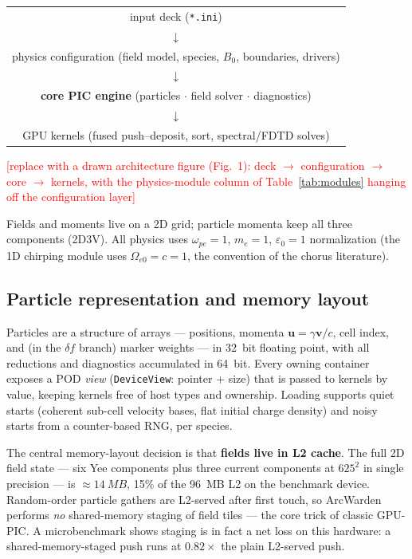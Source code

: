 \documentclass[11pt]{article}
\newcommand{\tocheck}[1]{\textcolor{red}{[#1]}}
\newcommand{\arcw}{ArcWarden}
\begin{document}
\begin{center}
\begin{tabular}{c}
input deck (\texttt{*.ini})\\
$\downarrow$\\
physics configuration (field model, species, $B_0$, boundaries, drivers)\\
$\downarrow$\\
\textbf{core PIC engine} (particles $\cdot$ field solver $\cdot$ diagnostics)\\
$\downarrow$\\
GPU kernels (fused push--deposit, sort, spectral/FDTD solves)
\end{tabular}
\end{center}
\tocheck{replace with a drawn architecture figure (Fig.~1): deck
$\to$ configuration $\to$ core $\to$ kernels, with the physics-module
column of Table~\ref{tab:modules} hanging off the configuration layer}

Fields and moments live on a 2D grid; particle momenta keep all three
components (2D3V). All physics uses $\omega_{pe}=1$, $m_e=1$,
$\varepsilon_0=1$ normalization (the 1D chirping module uses
$\Omega_{e0}=c=1$, the convention of the chorus literature).

\subsection{Particle representation and memory layout}
\label{sec:arch-particles}
Particles are a structure of arrays --- positions, momenta
$\mathbf{u}=\gamma\mathbf{v}/c$, cell index, and (in the $\delta f$
branch) marker weights --- in \SI{32}{bit} floating point, with all
reductions and diagnostics accumulated in \SI{64}{bit}. Every owning
container exposes a POD \emph{view} (\texttt{DeviceView}: pointer +
size) that is passed to kernels by value, keeping kernels free of host
types and ownership. Loading supports quiet starts (coherent sub-cell
velocity bases, flat initial charge density) and noisy starts from a
counter-based RNG, per species.

The central memory-layout decision is that \textbf{fields live in L2
cache}. The full 2D field state --- six Yee components plus three
current components at $625^2$ in single precision --- is
$\approx\SI{14}{MB}$, 15\% of the \SI{96}{MB} L2 on the benchmark
device. Random-order particle gathers are L2-served after first touch,
so \arcw{} performs \emph{no} shared-memory staging of field tiles ---
the core trick of classic GPU-PIC. A microbenchmark shows staging is
in fact a net loss on this hardware: a shared-memory-staged push runs
at $0.82\times$ the plain L2-served push.
\end{document}
